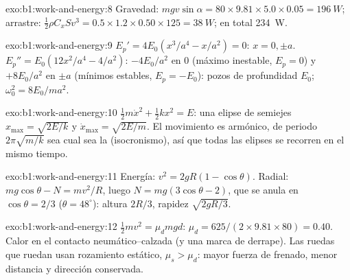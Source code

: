 \begin{solution}{exo:b1:work-and-energy:8}
Gravedad: $mgv\sin\alpha = 80 \times 9.81 \times 5.0 \times 0.05 = \qty{196}{W}$;
arrastre: $\tfrac12\rho C_xSv^3 = 0.5 \times 1.2 \times 0.50 \times 125 =
\qty{38}{W}$; en total \qty{234}{W}.
\end{solution}

\begin{solution}{exo:b1:work-and-energy:9}
$E_p' = 4E_0(x^3/a^4 - x/a^2) = 0$: $x = 0, \pm a$. $E_p'' = E_0(12x^2/a^4 -
4/a^2)$: $-4E_0/a^2$ en $0$ (máximo inestable, $E_p = 0$) y $+8E_0/a^2$
en $\pm a$ (mínimos estables, $E_p = -E_0$): pozos de profundidad $E_0$;
$\omega_0^2 = 8E_0/ma^2$.
\end{solution}

\begin{solution}{exo:b1:work-and-energy:10}
$\tfrac12 m\dot x^2 + \tfrac12 kx^2 = E$: una elipse de semiejes $x_{\max}
= \sqrt{2E/k}$ y $\dot x_{\max} = \sqrt{2E/m}$. El movimiento es armónico,
de periodo $2\pi\sqrt{m/k}$ sea cual sea la  (isocronismo), así
que todas las elipses se recorren en el mismo tiempo.
\end{solution}

\begin{solution}{exo:b1:work-and-energy:11}
Energía: $v^2 = 2gR(1 - \cos\theta)$. Radial: $mg\cos\theta - N = mv^2/R$,
luego $N = mg(3\cos\theta - 2)$, que se anula en $\cos\theta = 2/3$ ($\theta =
48^\circ$): altura $2R/3$, rapidez $\sqrt{2gR/3}$.
\end{solution}

\begin{solution}{exo:b1:work-and-energy:12}
$\tfrac12 mv^2 = \mu_dmgd$: $\mu_d = 625/(2 \times 9.81 \times 80) = 0.40$.
Calor en el contacto neumático--calzada (y una marca de derrape). Las
ruedas que ruedan usan rozamiento estático, $\mu_s > \mu_d$: mayor fuerza
de frenado, menor distancia y dirección conservada.
\end{solution}

